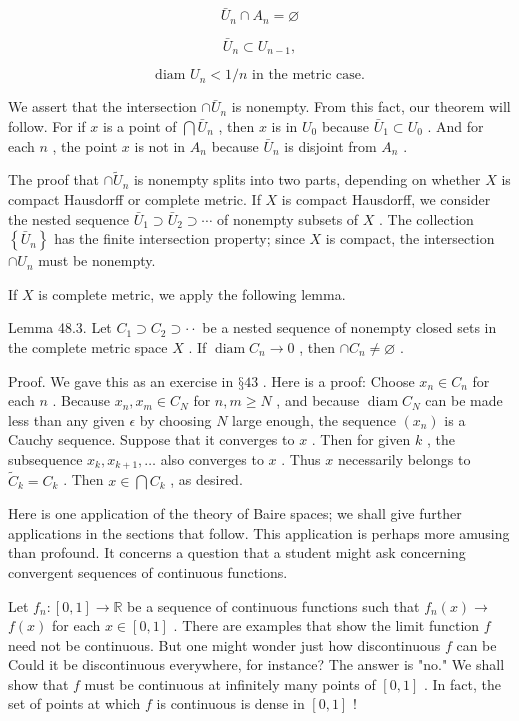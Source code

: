 \[
{\bar{U}}_{n} \cap  {A}_{n} = \varnothing
\]

\[
{\bar{U}}_{n} \subset  {U}_{n - 1},
\]

\[
\text{ diam }{U}_{n} < 1/n\text{ in the metric case. }
\]

We assert that the intersection \(\cap  {\bar{U}}_{n}\) is nonempty. From this fact, our theorem will follow. For if \(x\) is a point of \(\bigcap {\bar{U}}_{n}\) , then \(x\) is in \({U}_{0}\) because \({\bar{U}}_{1} \subset  {U}_{0}\) . And for each \(n\) , the point \(x\) is not in \({A}_{n}\) because \({\bar{U}}_{n}\) is disjoint from \({A}_{n}\) .

The proof that \(\cap  {\widetilde{U}}_{n}\) is nonempty splits into two parts, depending on whether \(X\) is compact Hausdorff or complete metric. If \(X\) is compact Hausdorff, we consider the nested sequence \({\bar{U}}_{1} \supset  {\bar{U}}_{2} \supset  \cdots\) of nonempty subsets of \(X\) . The collection \(\left\{  {\bar{U}}_{n}\right\}\) has the finite intersection property; since \(X\) is compact, the intersection \(\cap  {U}_{n}\) must be nonempty.

If \(X\) is complete metric, we apply the following lemma.

Lemma 48.3. Let \({C}_{1} \supset  {C}_{2} \supset   \cdot   \cdot\) be a nested sequence of nonempty closed sets in the complete metric space \(X\) . If \(\operatorname{diam}{C}_{n} \rightarrow  0\) , then \(\cap  {C}_{n} \neq  \varnothing\) .

Proof. We gave this as an exercise in \(§{43}\) . Here is a proof: Choose \({x}_{n} \in  {C}_{n}\) for each \(n\) . Because \({x}_{n},{x}_{m} \in  {C}_{N}\) for \(n,m \geq  N\) , and because \(\operatorname{diam}{C}_{N}\) can be made less than any given \(\epsilon\) by choosing \(N\) large enough, the sequence \(\left( {x}_{n}\right)\) is a Cauchy sequence. Suppose that it converges to \(x\) . Then for given \(k\) , the subsequence \({x}_{k},{x}_{k + 1},\ldots\) also converges to \(x\) . Thus \(x\) necessarily belongs to \({\widetilde{C}}_{k} = {C}_{k}\) . Then \(x \in  \bigcap {C}_{k}\) , as desired.

Here is one application of the theory of Baire spaces; we shall give further applications in the sections that follow. This application is perhaps more amusing than profound. It concerns a question that a student might ask concerning convergent sequences of continuous functions.

Let \({f}_{n} : \left\lbrack  {0,1}\right\rbrack   \rightarrow  \mathbb{R}\) be a sequence of continuous functions such that \({f}_{n}\left( x\right)  \rightarrow\)  \(f\left( x\right)\) for each \(x \in  \left\lbrack  {0,1}\right\rbrack\) . There are examples that show the limit function \(f\) need not be continuous. But one might wonder just how discontinuous \(f\) can be Could it be discontinuous everywhere, for instance? The answer is "no." We shall show that \(f\) must be continuous at infinitely many points of \(\left\lbrack  {0,1}\right\rbrack\) . In fact, the set of points at which \(f\) is continuous is dense in \(\left\lbrack  {0,1}\right\rbrack\) !


